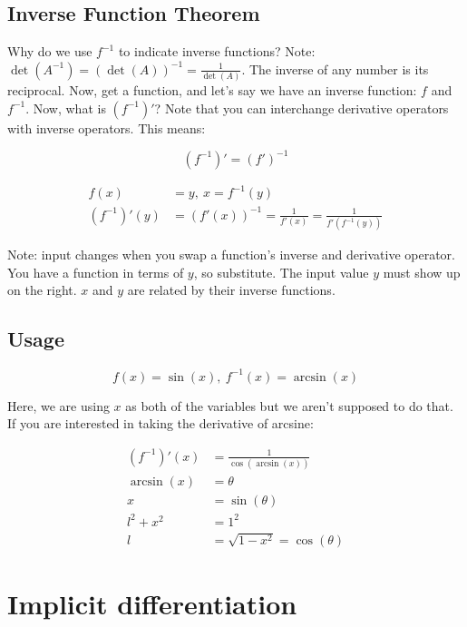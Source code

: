 \documentclass[12pt]{article}
\theoremstyle{plain}
\theoremstyle{remark}
\theoremstyle{definition}
\begin{document}
\subsection{Inverse Function Theorem}

Why do we use \(f^{- 1}\) to indicate inverse functions? Note:
\(\det\left( A^{- 1} \right) = \left( \det(A) \right)^{- 1} = \frac{1}{\det(A)}\).
The inverse of any number is its reciprocal. Now, get a function, and
let's say we have an inverse function: \(f\) and \(f^{- 1}\). Now, what
is \((f^{- 1})'\)? Note that you can interchange derivative operators
with inverse operators. This means:

\[\left( f^{- 1} \right)' = \left( f' \right)^{- 1}\]

\begin{align*}
f(x) &= y,\ x = f^{- 1}(y) \\
\left( f^{- 1} \right)'(y) &= \left( f'(x) \right)^{- 1} = \frac{1}{f'(x)} = \frac{1}{f'\left( f^{- 1}(y) \right)}
\end{align*}


Note: input changes when you swap a function's inverse and derivative
operator. You have a function in terms of \(y\), so substitute. The
input value \(y\) must show up on the right. \(x\) and \(y\) are related
by their inverse functions.


\subsection{Usage}

\[f(x) = \sin(x),\ f^{- 1}(x) = \arcsin(x)\]

Here, we are using \(x\) as both of the variables but we aren't supposed
to do that. If you are interested in taking the derivative of arcsine:

\begin{align*}
\left( f^{- 1} \right)'(x) &= \frac{1}{\cos\left( \arcsin(x) \right)} \\
\arcsin(x) &= \theta \\
x &= \sin(\theta) \\
l^{2} + x^{2} &= 1^{2} \\
l &= \sqrt{1 - x^{2}} = \cos(\theta)
\end{align*}




\section{Implicit differentiation}
\end{document}
